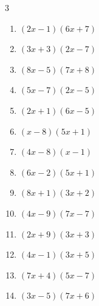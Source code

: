 \begin{multicols}{3}
\begin{enumerate}

  \item $(2x-1)(6x+7)$


  \item $(3x+3)(2x-7)$


\columnbreak %

\resetques

  \item $(8x-5)(7x+8)$


  \item $(5x-7)(2x-5)$


  \item $(2x+1)(6x-5)$


  \item $(x-8)(5x+1)$


  \item $(4x-8)(x-1)$


  \item $(6x-2)(5x+1)$


  \item $(8x+1)(3x+2)$


  \item $(4x-9)(7x-7)$


  \item $(2x+9)(3x+3)$


  \item $(4x-1)(3x+5)$


  \item $(7x+4)(5x-7)$


  \item $(3x-5)(7x+6)$


\end{enumerate}
\end{multicols}
